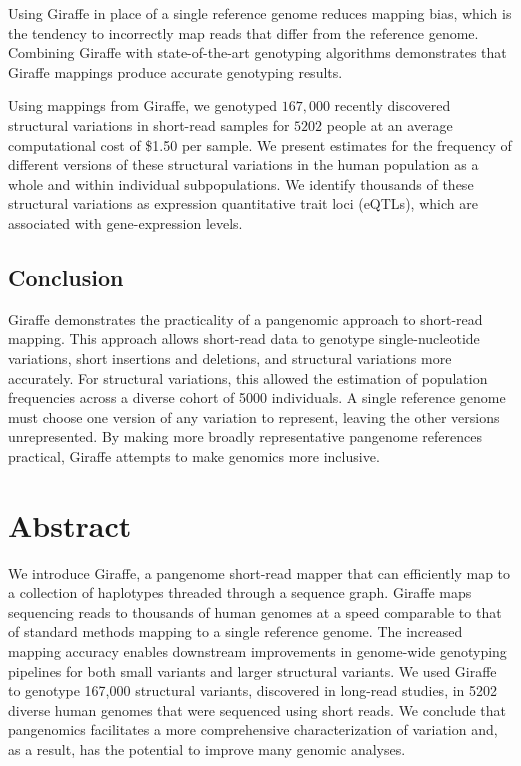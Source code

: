 \documentclass[11pt]{ucscthesis}
\begin{document}
Using Giraffe in place of a single reference genome reduces mapping bias, which is the tendency to incorrectly map reads that differ from the reference genome.
Combining Giraffe with state-of-the-art genotyping algorithms demonstrates that Giraffe mappings produce accurate genotyping results.

Using mappings from Giraffe, we genotyped $167,000$ recently discovered structural variations in short-read samples for $5202$ people at an average computational cost of \$1.50 per sample.
We present estimates for the frequency of different versions of these structural variations in the human population as a whole and within individual subpopulations.
We identify thousands of these structural variations as expression quantitative trait loci (eQTLs), which are associated with gene-expression levels.

\subsection{Conclusion}
Giraffe demonstrates the practicality of a pangenomic approach to short-read mapping.
This approach allows short-read data to genotype single-nucleotide variations, short insertions and deletions, and structural variations more accurately.
For structural variations, this allowed the estimation of population frequencies across a diverse cohort of 5000 individuals.
A single reference genome must choose one version of any variation to represent, leaving the other versions unrepresented.
By making more broadly representative pangenome references practical, Giraffe attempts to make genomics more inclusive.

\section{Abstract}
We introduce Giraffe, a pangenome short-read mapper that can efficiently map to a collection of haplotypes threaded through a sequence graph.
Giraffe maps sequencing reads to thousands of human genomes at a speed comparable to that of standard methods mapping to a single reference genome.
The increased mapping accuracy enables downstream improvements in genome-wide genotyping pipelines for both small variants and larger structural variants.
We used Giraffe to genotype 167,000 structural variants, discovered in long-read studies, in 5202 diverse human genomes that were sequenced using short reads.
We conclude that pangenomics facilitates a more comprehensive characterization of variation and, as a result, has the potential to improve many genomic analyses.
\end{document}
